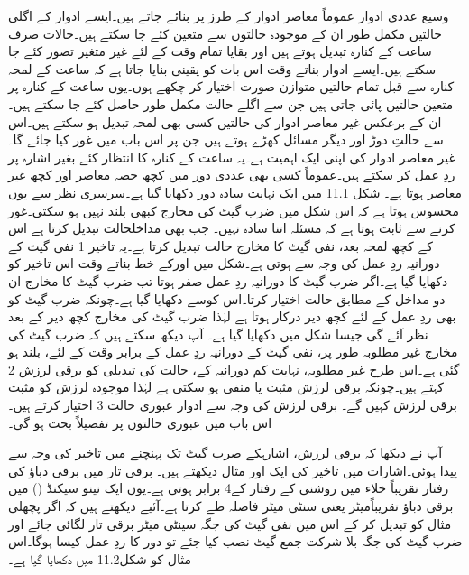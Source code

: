 	وسیع عددی ادوار عموماً معاصر ادوار کے طرز پر بنائے جاتے ہیں۔ایسے ادوار کے اگلی حالتیں مکمل طور ان کے موجودہ حالتوں سے متعین کئے جا سکتے ہیں۔حالات صرف ساعت کے کنارہ تبدیل ہوتے ہیں اور بقایا تمام وقت کے لئے غیر متغیر تصور کئے جا سکتے ہیں۔ایسے ادوار بناتے وقت اس بات کو یقینی بنایا جاتا ہے کہ ساعت کے لمحہ کنارہ سے قبل تمام حالتیں متوازن صورت اختیار کر چکھے ہوں۔یوں ساعت کے کنارہ پر متعین حالتیں پائی جاتی ہیں جن سے اگلے حالت مکمل طور حاصل کئے جا سکتے ہیں۔ 
	ان کے برعکس غیر معاصر ادوار کی حالتیں کسی بھی لمحہ تبدیل ہو سکتے ہیں۔اس سے حالتِ دوڑ اور دیگر مسائل کھڑے ہوتے ہیں جن پر اس باب میں غور کیا جائے گا۔
	غیر معاصر ادوار کی اپنی ایک اہمیت ہے۔یہ ساعت کے کنارہ کا انتظار کئے بغیر اشارہ پر ردِ عمل کر سکتے ہیں۔عموماً کسی بھی عددی دور میں کچھ حصہ معاصر اور کچھ غیر معاصر ہوتا ہے۔
	شکل 11.1 میں ایک نہایت سادہ دور دکھایا گیا ہے۔سرسری نظر سے یوں محسوس ہوتا ہے کہ اس شکل میں ضرب گیٹ کی مخارج کبھی بلند نہیں ہو سکتی۔غور کرنے سے ثابت ہوتا ہے کہ مسئلہ اتنا سادہ نہیں۔
	جب بھی مداخلحالت تبدیل کرتا ہے اس کے کچھ لمحہ بعد، نفی گیٹ کا مخارج حالت تبدیل کرتا ہے۔یہ تاخیر 1 نفی گیٹ کے دورانیہ ردِ عمل کی وجہ سے ہوتی ہے۔شکل میں اورکے خط بناتے وقت اس تاخیر کو دکھایا گیا ہے۔اگر ضرب گیٹ کا دورانیہ ردِ عمل صفر ہوتا تب ضرب گیٹ کا مخارج ان دو مداخل کے مطابق حالت اختیار کرتا۔اس کوسے دکھایا گیا ہے۔چونکہ ضرب گیٹ کو بھی ردِ عمل کے لئے کچھ دیر درکار ہوتا ہے لہٰذا ضرب گیٹ کی مخارج کچھ دیر کے بعد نظر آئے گی جیسا شکل میں دکھایا گیا ہے۔
	آپ دیکھ سکتے ہیں کہ ضرب گیٹ کی مخارج غیر مطلوبہ طور پر، نفی گیٹ کے دورانیہ ردِ عمل کے برابر وقت کے لئے، بلند ہو گئی ہے۔اس طرح غیر مطلوبہ، نہایت کم دورانیہ کے، حالت کی تبدیلی کو برقی لرزش 2 کہتے ہیں۔چونکہ برقی لرزش مثبت یا منفی ہو سکتی ہے لہٰذا موجودہ لرزش کو مثبت برقی لرزش کہیں گے۔
	برقی لرزش کی وجہ سے ادوار عبوری حالت 3 اختیار کرتے ہیں۔اس باب میں عبوری حالتوں پر تفصیلاً بحث ہو گی۔  

	آپ نے دیکھا کہ برقی لرزش، اشارہکے ضرب گیٹ تک پہنچنے میں تاخیر کی وجہ سے پیدا ہوئی۔اشارات میں تاخیر کی ایک اور مثال دیکھتے ہیں۔
	برقی تار میں برقی دباؤ کی رفتار تقریباً خلاء میں روشنی کے رفتار کے4 برابر ہوتی ہے۔یوں ایک نینو سیکنڈ () میں برقی دباؤ تقریباًمیٹر یعنی سنٹی میٹر فاصلہ طے کرتا ہے۔آئیے دیکھتے ہیں کہ اگر پچھلی مثال کو تبدیل کر کے اس میں نفی گیٹ کی جگہ سینٹی میٹر برقی تار لگائی جائے اور ضرب گیٹ کی جگہ بلا شرکت جمع گیٹ نصب کیا جئے تو دور کا ردِ عمل کیسا ہوگا۔اس مثال کو شکل11.2 میں دکھایا گیا ہے۔


